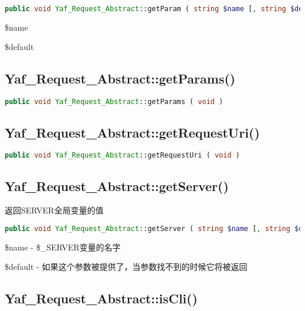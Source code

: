 \begin{lstlisting}[language=PHP]
public void Yaf_Request_Abstract::getParam ( string $name [, string $default ] )
\end{lstlisting}

\begin{compactitem}
\item \$name
\item \$default
\end{compactitem}



\subsection{Yaf\_Request\_Abstract::getParams()}




\begin{lstlisting}[language=PHP]
public void Yaf_Request_Abstract::getParams ( void )
\end{lstlisting}



\subsection{Yaf\_Request\_Abstract::getRequestUri()}




\begin{lstlisting}[language=PHP]
public void Yaf_Request_Abstract::getRequestUri ( void )
\end{lstlisting}



\subsection{Yaf\_Request\_Abstract::getServer()}

返回SERVER全局变量的值

\begin{lstlisting}[language=PHP]
public void Yaf_Request_Abstract::getServer ( string $name [, string $default ] )
\end{lstlisting}

\begin{compactitem}
\item \$name - \$\_SERVER变量的名字
\item \$default - 如果这个参数被提供了，当参数找不到的时候它将被返回
\end{compactitem}

\subsection{Yaf\_Request\_Abstract::isCli()}




